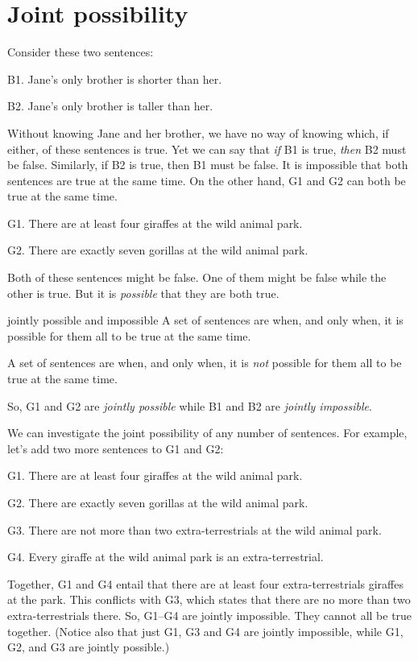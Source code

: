 \section{Joint possibility}\label{s:joint-poss}

Consider these two sentences:
	\begin{ebullet}
		\item[B1.] Jane's only brother is shorter than her.
		\item[B2.] Jane's only brother is taller than her.
	\end{ebullet}
Without knowing Jane and her brother, we have no way of knowing which, if either, of these sentences is true. Yet we can say that \emph{if} B1 is true, \emph{then} B2 must be false. Similarly, if B2 is true, then B1 must be false. It is impossible that both sentences are true at the same time. On the other hand, G1 and G2 can both be true at the same time.
	\begin{ebullet}	
		\item[G1.] \label{MartianGiraffes} There are at least four giraffes at the wild animal park.
		\item[G2.] There are exactly seven gorillas at the wild animal park.
	\end{ebullet}
Both of these sentences might be false. One of them might be false while the other is true. But it  is \textit{possible} that they are both true.

\begin{factboxy}{jointly possible and impossible}
A set of sentences are  when, and only when, it is possible for them all to be true at the same time.
\medskip

A set of sentences are  when, and only when, it is \textit{not} possible for them all to be true at the same time.
\end{factboxy}
\noindent So, G1 and G2 are \textit{jointly possible} while B1 and B2 are \emph{jointly impossible}.

We can investigate the joint possibility of any number of sentences. For example, let's add two more sentences to G1 and G2:
	\begin{ebullet}	
		\item[G1.] There are at least four giraffes at the wild animal park.
		\item[G2.] There are exactly seven gorillas at the wild animal park.
		\item[G3.] There are not more than two extra-terrestrials at the wild animal park.
		\item[G4.] Every giraffe at the wild animal park is an extra-terrestrial.
	\end{ebullet}
Together, G1 and G4 entail that there are at least four extra-terrestrials giraffes at the park. This conflicts with G3, which states that there are no more than two extra-terrestrials there. So, G1--G4 are jointly impossible. They cannot all be true together. (Notice also that just G1, G3 and G4 are jointly impossible, while G1, G2, and G3 are jointly possible.)



